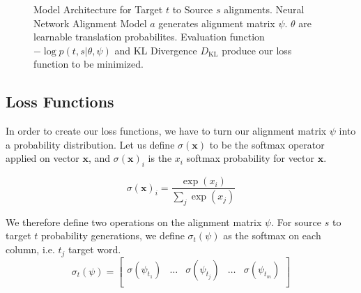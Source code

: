 \documentclass[twoside,twocolumn]{article}
\renewcommand{\vec}[1]{\mathbf{#1}}
\begin{document}
\begin{figure}
\centering
{}
\caption{Model Architecture for Target $t$ to Source $s$ alignments. Neural Network Alignment Model $a$ generates alignment matrix $\psi$. $\theta$ are learnable translation probabilites. Evaluation function $- \log p(t, s | \theta, \psi)$ and KL Divergence $D_{\mathrm{KL}}$ produce our loss function to be minimized.}
\end{figure}

\subsection{Loss Functions}
In order to create our loss functions, we have to turn our alignment matrix $\psi$ into a probability distribution. Let us define $\sigma(\vec{x})$ to be the softmax operator applied on vector $\vec{x}$, and $\sigma(\vec{x})_i$ is the $x_i$ softmax probability for vector $\vec{x}$.

\begin{equation}
\sigma(\vec{x})_i = \frac{\exp(x_i)}{\sum_j\exp(x_j)}
\end{equation}

We therefore define two operations on the alignment matrix $\psi$. For source $s$ to target $t$ probability generations, we define $\sigma_t(\psi)$ as the softmax on each column, i.e. $t_j$ target word.
\begin{equation}
  \sigma_t(\psi) = \left[
    \begin{matrix}
      \sigma(\psi_{t_1}) &
      \hdots &
      \sigma(\psi_{t_j}) &
      \hdots &
      \sigma(\psi_{t_m})  \\
    \end{matrix}
\right]
\end{equation}
\end{document}
